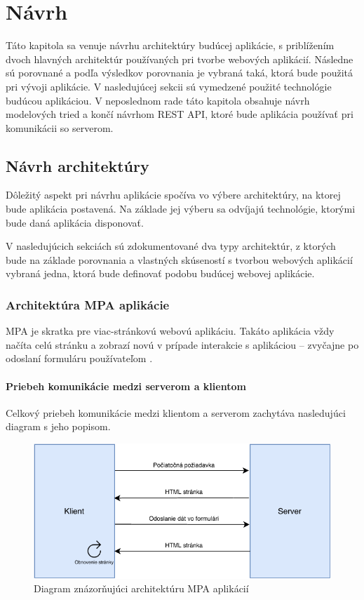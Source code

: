 \chapter{Návrh}
Táto kapitola sa venuje návrhu architektúry budúcej aplikácie, s priblížením dvoch hlavných architektúr používaných pri tvorbe webových aplikácií. Následne sú porovnané a podľa výsledkov porovnania je vybraná taká, ktorá bude použitá pri vývoji aplikácie. V nasledujúcej sekcii sú vymedzené použité technológie budúcou aplikáciou. V neposlednom rade táto kapitola obsahuje návrh modelových tried a končí návrhom REST API, ktoré bude aplikácia používať pri komunikácii so serverom.

\section{Návrh architektúry}
Dôležitý aspekt pri návrhu aplikácie spočíva vo výbere architektúry, na ktorej bude aplikácia postavená. Na základe jej výberu sa odvíjajú technológie, ktorými bude daná aplikácia disponovať.

V nasledujúcich sekciách sú zdokumentované dva typy architektúr, z ktorých bude na základe porovnania a vlastných skúseností s tvorbou webových aplikácií vybraná jedna, ktorá bude definovať podobu budúcej webovej aplikácie.

\subsection{Architektúra MPA aplikácie}
MPA je skratka pre viac-stránkovú webovú aplikáciu. Takáto aplikácia vždy načíta celú stránku a zobrazí novú v prípade  interakcie s aplikáciou -- zvyčajne po odoslaní formuláru používateľom \cite{spa-vs-mpa-1}.

\subsubsection*{Priebeh komunikácie medzi serverom a klientom}
Celkový priebeh komunikácie medzi klientom a serverom zachytáva nasledujúci diagram s jeho popisom.

\begin{figure}[H]
	\includegraphics[width=1.0\textwidth]{media/navrh/MPA.pdf}
	\caption{Diagram znázorňujúci architektúru MPA aplikácií}\label{mpa-graf}
\end{figure}

